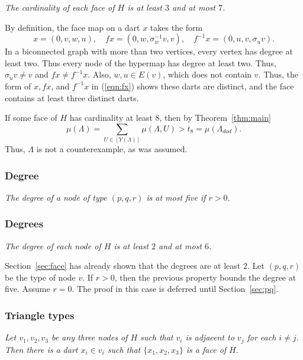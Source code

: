 \documentclass{article} %
\begin{document}
{\it The cardinality of each face of $H$ is at least $3$ and at most $7$.}


By  definition, the face map on a dart $x$ takes the form
\begin{equation}\label{eqn:fx}
x = (0,v,w,u),\quad
f x = (0,w,\sigma_w^{-1}v,v),\quad
f^{-1} x = (0,u,v,\sigma_u v).
\end{equation}
In a biconnected graph with more than two vertices,
every vertex has degree at least two.
Thus every node of the hypermap has degree
at least two.  Thus, $\sigma_u v\ne v$ and $f x\ne f^{-1} x$.
Also, $w,u\in E(v)$, which does not contain $v$.  Thus, 
the form of $x,fx$, and 
$f^{-1} x$
in (\ref{eqn:fx}) shows these darts are distinct, and
the
face contains at least three distinct darts.

If some face of $H$ has cardinality at least $8$, then by Theorem~\ref{thm:main}
$$
\mu(\Lambda) =\sum_{U\in [Y(\Lambda)]}\mu(\Lambda,U) > t_8 =\mu(\Lambda_{dod}).
$$
Thus, $\Lambda$ is not a counterexample, as was assumed.

\subsubsection{Degree}

{\it The degree of a node of type $(p,q,r)$ is at most five if $r>0$.}


\subsubsection{Degrees}\label{sec:degrees}

{\it The degree of each node of $H$ is at least $2$ and at most $6$.}

Section~\ref{sec:face} has already shown that the degrees are at least $2$.
Let $(p,q,r)$ be the type of node $v$.  If $r>0$, then the previous
property bounds the degree at five.  Assume $r=0$.  The
proof in this case is deferred until Section~\ref{sec:pq}.

\subsubsection{Triangle types}

{\it Let $v_1,v_2,v_3$ be any three nodes of $H$ such that $v_i$ is
adjacent to $v_j$ for each $i\ne j$. Then there is a dart $x_i\in v_i$
such that $\{x_1,x_2,x_3\}$ is a face of $H$.}
\end{document}
